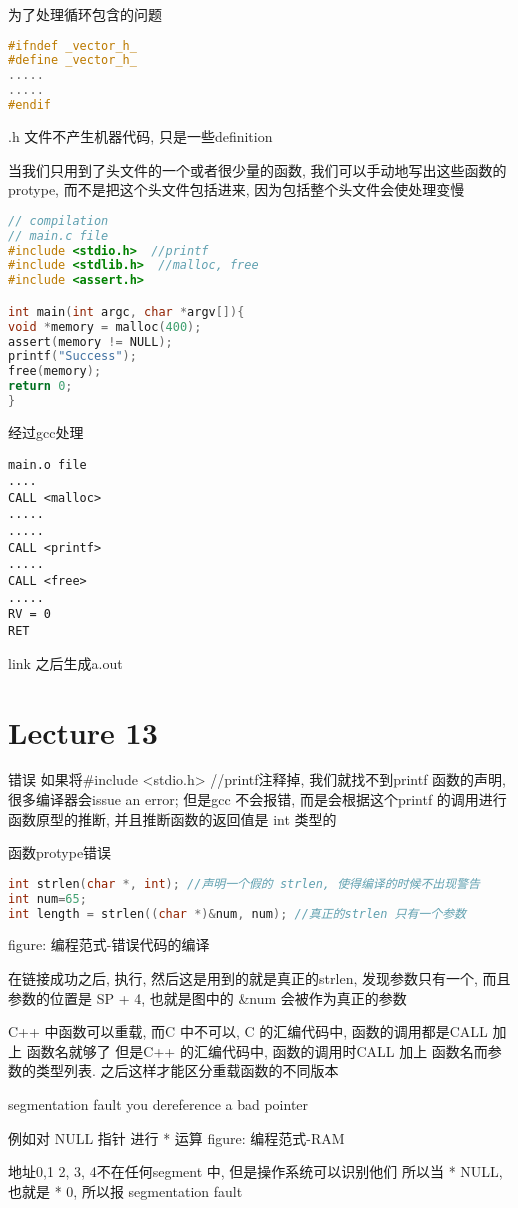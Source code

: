 \documentclass{article}
\begin{document}
为了处理循环包含的问题
\begin{lstlisting}[language = C]
#ifndef _vector_h_
#define _vector_h_
.....
.....
#endif
\end{lstlisting}
.h 文件不产生机器代码, 只是一些definition

当我们只用到了头文件的一个或者很少量的函数, 我们可以手动地写出这些函数的protype, 而不是把这个头文件包括进来, 因为包括整个头文件会使处理变慢

\begin{lstlisting}[language = C]
// compilation
// main.c file
#include <stdio.h>  //printf
#include <stdlib.h>  //malloc, free
#include <assert.h>

int main(int argc, char *argv[]){
void *memory = malloc(400);
assert(memory != NULL);
printf("Success");
free(memory);
return 0;
}
\end{lstlisting}

经过gcc处理
\begin{verbatim}
main.o file
....
CALL <malloc>
.....
.....
CALL <printf>
.....
CALL <free>
.....
RV = 0
RET
\end{verbatim}
link 之后生成a.out

\section{Lecture 13}
错误
如果将\#include <stdio.h>  //printf注释掉, 我们就找不到printf 函数的声明, 很多编译器会issue an error; 但是gcc 不会报错, 而是会根据这个printf 的调用进行函数原型的推断, 并且推断函数的返回值是 int 类型的

函数protype错误
\begin{lstlisting}[language = C]
int strlen(char *, int); //声明一个假的 strlen, 使得编译的时候不出现警告
int num=65;
int length = strlen((char *)&num, num); //真正的strlen 只有一个参数
\end{lstlisting}
figure: 编程范式-错误代码的编译
 
在链接成功之后, 执行, 然后这是用到的就是真正的strlen, 发现参数只有一个, 而且参数的位置是
SP + 4, 也就是图中的 \&num 会被作为真正的参数

C++ 中函数可以重载, 而C 中不可以,
C 的汇编代码中, 函数的调用都是CALL 加上 函数名就够了
但是C++ 的汇编代码中, 函数的调用时CALL 加上 函数名而参数的类型列表. 之后这样才能区分重载函数的不同版本

segmentation fault
you dereference a bad pointer

例如对 NULL 指针 进行 * 运算
figure: 编程范式-RAM
 
地址0,1 2, 3, 4不在任何segment 中, 但是操作系统可以识别他们
所以当 * NULL, 也就是 * 0, 所以报 segmentation fault
\end{document}
